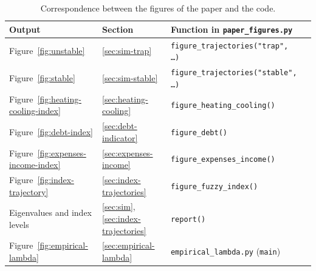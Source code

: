 \documentclass[11pt,a4paper]{article}
\begin{document}
\begin{table}[h!]
\centering
\small
\begin{tabular}{llll}
\toprule
\textbf{Output} & \textbf{Section} & \textbf{Function in \texttt{paper\_figures.py}} \\
\midrule
Figure~\ref{fig:unstable} & \ref{sec:sim-trap} & \texttt{figure\_trajectories("trap", \ldots)} \\
Figure~\ref{fig:stable} & \ref{sec:sim-stable} & \texttt{figure\_trajectories("stable", \ldots)} \\
Figure~\ref{fig:heating-cooling-index} & \ref{sec:heating-cooling} & \texttt{figure\_heating\_cooling()} \\
Figure~\ref{fig:debt-index} & \ref{sec:debt-indicator} & \texttt{figure\_debt()} \\
Figure~\ref{fig:expenses-income-index} & \ref{sec:expenses-income} & \texttt{figure\_expenses\_income()} \\
Figure~\ref{fig:index-trajectory} & \ref{sec:index-trajectories} & \texttt{figure\_fuzzy\_index()} \\
Eigenvalues and index levels & \ref{sec:sim}, \ref{sec:index-trajectories} & \texttt{report()} \\
Figure~\ref{fig:empirical-lambda} & \ref{sec:empirical-lambda} & \texttt{empirical\_lambda.py} (\texttt{main}) \\
\bottomrule
\end{tabular}
\caption{Correspondence between the figures of the paper and the code.}
\label{tab:code-map}
\end{table}




\end{document}
